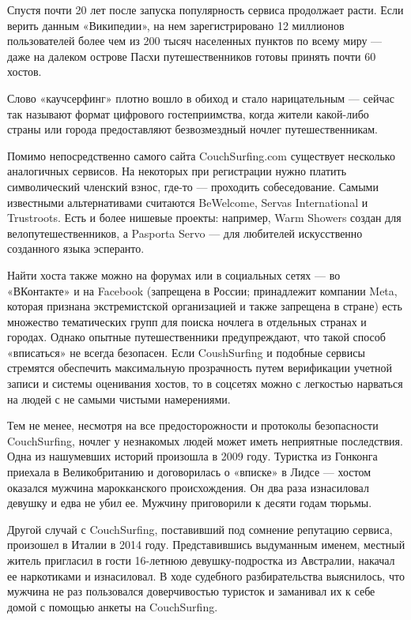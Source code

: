 Спустя почти 20 лет после запуска популярность сервиса продолжает расти. Если верить данным «Википедии», на нем зарегистрировано 12 миллионов пользователей более чем из 200 тысяч населенных пунктов по всему миру — даже на далеком острове Пасхи путешественников готовы принять почти 60 хостов.

Слово «каучсерфинг» плотно вошло в обиход и стало нарицательным — сейчас так называют формат цифрового гостеприимства, когда жители какой-либо страны или города предоставляют безвозмездный ночлег путешественникам.

Помимо непосредственно самого сайта CouchSurfing.com существует несколько аналогичных сервисов. На некоторых при регистрации нужно платить символический членский взнос, где-то — проходить собеседование. Самыми известными альтернативами считаются BeWelcome, Servas International и Trustroots. Есть и более нишевые проекты: например, Warm Showers создан для велопутешественников, а Pasporta Servo — для любителей искусственно созданного языка эсперанто.

Найти хоста также можно на форумах или в социальных сетях — во «ВКонтакте» и на Facebook (запрещена в России; принадлежит компании Meta, которая признана экстремистской организацией и также запрещена в стране) есть множество тематических групп для поиска ночлега в отдельных странах и городах. Однако опытные путешественники предупреждают, что такой способ «вписаться» не всегда безопасен. Если CoushSurfing и подобные сервисы стремятся обеспечить максимальную прозрачность путем верификации учетной записи и системы оценивания хостов, то в соцсетях можно с легкостью нарваться на людей с не самыми чистыми намерениями.

Тем не менее, несмотря на все предосторожности и протоколы безопасности CouchSurfing, ночлег у незнакомых людей может иметь неприятные последствия. Одна из нашумевших историй произошла в 2009 году. Туристка из Гонконга приехала в Великобританию и договорилась о «вписке» в Лидсе — хостом оказался мужчина марокканского происхождения. Он два раза изнасиловал девушку и едва не убил ее. Мужчину приговорили к десяти годам тюрьмы.

Другой случай с CouchSurfing, поставивший под сомнение репутацию сервиса, произошел в Италии в 2014 году. Представившись выдуманным именем, местный житель пригласил в гости 16-летнюю девушку-подростка из Австралии, накачал ее наркотиками и изнасиловал. В ходе судебного разбирательства выяснилось, что мужчина не раз пользовался доверчивостью туристок и заманивал их к себе домой с помощью анкеты на CouchSurfing.

